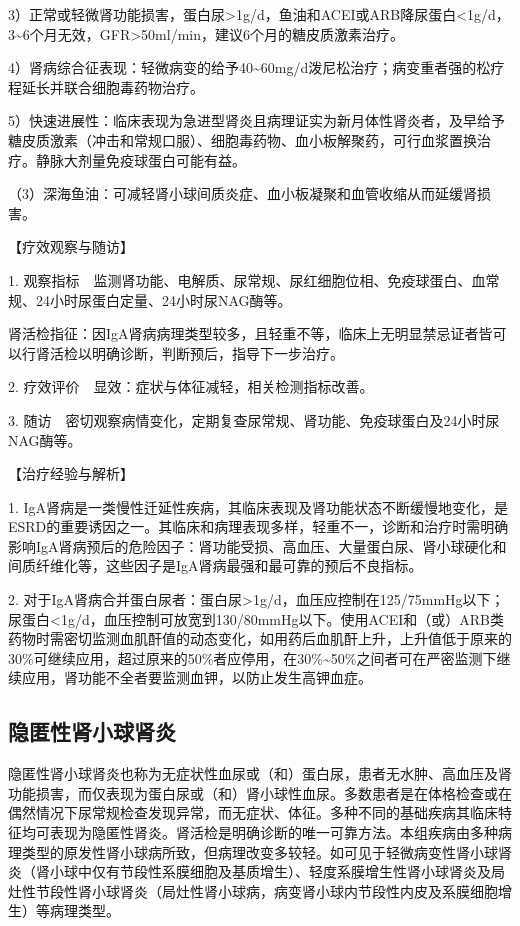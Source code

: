 3）正常或轻微肾功能损害，蛋白尿\textgreater{}1g/d，鱼油和ACEI或ARB降尿蛋白\textless{}1g/d，3\textasciitilde{}6个月无效，GFR\textgreater{}50ml/min，建议6个月的糖皮质激素治疗。

4）肾病综合征表现：轻微病变的给予40\textasciitilde{}60mg/d泼尼松治疗；病变重者强的松疗程延长并联合细胞毒药物治疗。

5）快速进展性：临床表现为急进型肾炎且病理证实为新月体性肾炎者，及早给予糖皮质激素（冲击和常规口服）、细胞毒药物、血小板解聚药，可行血浆置换治疗。静脉大剂量免疫球蛋白可能有益。

（3）深海鱼油：可减轻肾小球间质炎症、血小板凝聚和血管收缩从而延缓肾损害。

【疗效观察与随访】

1.
观察指标　监测肾功能、电解质、尿常规、尿红细胞位相、免疫球蛋白、血常规、24小时尿蛋白定量、24小时尿NAG酶等。

肾活检指征：因IgA肾病病理类型较多，且轻重不等，临床上无明显禁忌证者皆可以行肾活检以明确诊断，判断预后，指导下一步治疗。

2. 疗效评价　显效：症状与体征减轻，相关检测指标改善。

3.
随访　密切观察病情变化，定期复查尿常规、肾功能、免疫球蛋白及24小时尿NAG酶等。

【治疗经验与解析】

1.
IgA肾病是一类慢性迁延性疾病，其临床表现及肾功能状态不断缓慢地变化，是ESRD的重要诱因之一。其临床和病理表现多样，轻重不一，诊断和治疗时需明确影响IgA肾病预后的危险因子：肾功能受损、高血压、大量蛋白尿、肾小球硬化和间质纤维化等，这些因子是IgA肾病最强和最可靠的预后不良指标。

2.
对于IgA肾病合并蛋白尿者：蛋白尿\textgreater{}1g/d，血压应控制在125/75mmHg以下；尿蛋白\textless{}1g/d，血压控制可放宽到130/80mmHg以下。使用ACEI和（或）ARB类药物时需密切监测血肌酐值的动态变化，如用药后血肌酐上升，上升值低于原来的30\%可继续应用，超过原来的50\%者应停用，在30\%\textasciitilde{}50\%之间者可在严密监测下继续应用，肾功能不全者要监测血钾，以防止发生高钾血症。

\subsection{隐匿性肾小球肾炎}

隐匿性肾小球肾炎也称为无症状性血尿或（和）蛋白尿，患者无水肿、高血压及肾功能损害，而仅表现为蛋白尿或（和）肾小球性血尿。多数患者是在体格检查或在偶然情况下尿常规检查发现异常，而无症状、体征。多种不同的基础疾病其临床特征均可表现为隐匿性肾炎。肾活检是明确诊断的唯一可靠方法。本组疾病由多种病理类型的原发性肾小球病所致，但病理改变多较轻。如可见于轻微病变性肾小球肾炎（肾小球中仅有节段性系膜细胞及基质增生）、轻度系膜增生性肾小球肾炎及局灶性节段性肾小球肾炎（局灶性肾小球病，病变肾小球内节段性内皮及系膜细胞增生）等病理类型。

